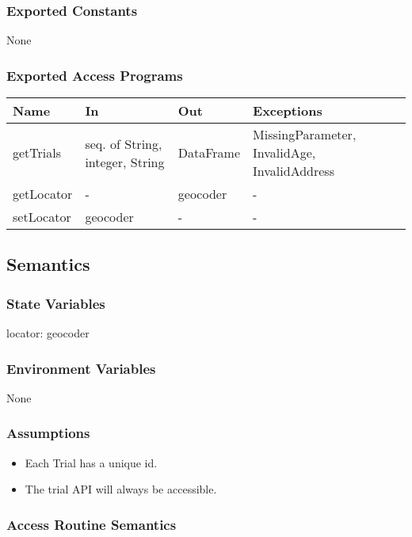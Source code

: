 \documentclass[12pt, titlepage]{article}
\begin{document}
\subsubsection{Exported Constants}
None

\subsubsection{Exported Access Programs}

\begin{center}
\begin{tabular}{p{4cm} p{4cm} p{4cm} p{4cm}}
\hline
\textbf{Name} & \textbf{In} & \textbf{Out} & \textbf{Exceptions} \\
\hline
getTrials & seq. of String, integer, String & DataFrame & MissingParameter, InvalidAge, InvalidAddress \\
\hline
getLocator & - & geocoder & - \\
\hline
setLocator & geocoder & - & - \\
\hline
\end{tabular}
\end{center}

\subsection{Semantics}

\subsubsection{State Variables}
locator: geocoder \\

\subsubsection{Environment Variables}
None

\subsubsection{Assumptions}
\begin{itemize}
  \item Each Trial has a unique id.
  \item The trial API will always be accessible.
\end{itemize}

\subsubsection{Access Routine Semantics}
\end{document}
